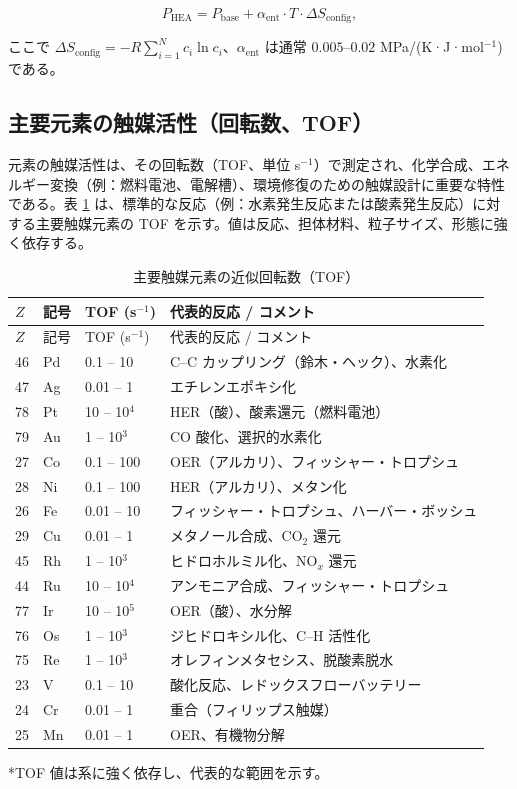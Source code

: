 \documentclass[11pt,a4paper]{article}
\theoremstyle{remark}
\begin{document}
	\begin{equation}
		P_{\text{HEA}} = P_{\text{base}} + \alpha_{\text{ent}} \cdot T \cdot \Delta S_{\text{config}},
		\label{eq:hea}
	\end{equation}
	
	ここで \(\Delta S_{\text{config}} = -R \sum_{i=1}^{N} c_i \ln c_i\)、\(\alpha_{\text{ent}}\) は通常 \(0.005\)–\(0.02\) MPa/(K·J·mol\(^{-1}\)) である。
	
	\subsection{主要元素の触媒活性（回転数、TOF）}
	\label{subsec:catalytic-activity}
	
	元素の触媒活性は、その回転数（TOF、単位 s\(^{-1}\)）で測定され、化学合成、エネルギー変換（例：燃料電池、電解槽）、環境修復のための触媒設計に重要な特性である。表 \ref{tab:tof-data} は、標準的な反応（例：水素発生反応または酸素発生反応）に対する主要触媒元素の TOF を示す。値は反応、担体材料、粒子サイズ、形態に強く依存する。
	
	\begin{longtable}{p{1.2cm}p{1.2cm}p{3.0cm}p{6.5cm}}
		\caption{主要触媒元素の近似回転数（TOF）} \label{tab:tof-data} \\
		\toprule
		\(Z\) & 記号 & TOF (s\(^{-1}\)) & 代表的反応 / コメント \\
		\midrule
		\endfirsthead
		\toprule
		\(Z\) & 記号 & TOF (s\(^{-1}\)) & 代表的反応 / コメント \\
		\midrule
		\endhead
		46 & Pd & 0.1 – 10 & C–C カップリング（鈴木・ヘック）、水素化 \\
		47 & Ag & 0.01 – 1 & エチレンエポキシ化 \\
		78 & Pt & 10 – 10\(^4\) & HER（酸）、酸素還元（燃料電池） \\
		79 & Au & 1 – 10\(^3\) & CO 酸化、選択的水素化 \\
		27 & Co & 0.1 – 100 & OER（アルカリ）、フィッシャー・トロプシュ \\
		28 & Ni & 0.1 – 100 & HER（アルカリ）、メタン化 \\
		26 & Fe & 0.01 – 10 & フィッシャー・トロプシュ、ハーバー・ボッシュ \\
		29 & Cu & 0.01 – 1 & メタノール合成、CO\(_2\) 還元 \\
		45 & Rh & 1 – 10\(^3\) & ヒドロホルミル化、NO\(_x\) 還元 \\
		44 & Ru & 10 – 10\(^4\) & アンモニア合成、フィッシャー・トロプシュ \\
		77 & Ir & 10 – 10\(^5\) & OER（酸）、水分解 \\
		76 & Os & 1 – 10\(^3\) & ジヒドロキシル化、C–H 活性化 \\
		75 & Re & 1 – 10\(^3\) & オレフィンメタセシス、脱酸素脱水 \\
		23 & V  & 0.1 – 10 & 酸化反応、レドックスフローバッテリー \\
		24 & Cr & 0.01 – 1 & 重合（フィリップス触媒） \\
		25 & Mn & 0.01 – 1 & OER、有機物分解 \\
		\bottomrule
	\end{longtable}
	*TOF 値は系に強く依存し、代表的な範囲を示す。
	
\end{document}
